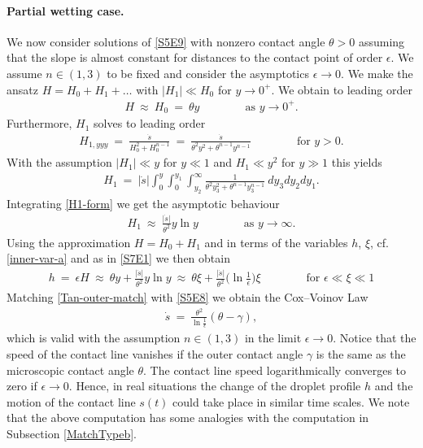 \documentclass[pagesize,pdftex]{amsart}
\newcommand{\gam}{\gamma}
\newcommand{\eps}{\epsilon}
\newcommand{\ang}{\theta}
\begin{document}
\paragraph{Partial wetting case.}

We now consider solutions of \eqref{S5E9} with nonzero contact angle $\ang > 0$
assuming that the slope is almost constant for distances to the contact point of
order $\eps$. We assume $n \in (1,3)$ to be fixed and consider the asymptotics $\eps \to 0$.  We make the ansatz
$H = H_0+H_1 + \ldots$ with $|H_1| \ll H_0$ for $y \to 0^+$. We obtain to
leading order%
\begin{align}
  H  \ %
  \approx \ H_0 \ %
  = \ \ang y \qquad\qquad \text{as $y\to 0^+$}.
\end{align}
Furthermore, $H_1$ solves to leading order
\begin{align}
  H_{1,yyy} \ %
  = \ \frac{\dot s}{H_0^2+H_0^{n-1}} \ %
  = \ \frac{\dot s}{\ang^2 y^2  + \ang^{n-1} y^{n-1}} \qquad\qquad %
  \text{for $y>0$.} 
\end{align}
With the assumption $|H_1| \ll y$ for $y \ll 1$ and $H_1 \ll y^2$ for $y \gg 1$
this yields%
\begin{align} \label{H1-form} %
  H_1 \ %
  = \ |\dot s| \int_0^y \int_0^{y_1} \int_{y_2}^{\infty }\frac{1}{\ang^2 y_3^2 +
  \ang^{n-1} y_3^{n-1}} \ dy_3 dy_2 dy_1.
\end{align}
Integrating \eqref{H1-form} we get the asymptotic behaviour 
\begin{align}
  H_1 \ %
  \approx \ \frac{|\dot s|}{\ang^2}y\ln y \qquad\qquad %
  \text{as $y\to \infty$.}
\end{align}
Using the approximation $H = H_0 + H_1$ and in terms of the variables $h$,
$\xi$, cf. \eqref{inner-var-a} and as in \eqref{S7E1} we then obtain%
\begin{align} \label{Tan-outer-match} %
  h \ = \ \eps H \ %
  \approx \ \ang y+ \frac{|\dot s|}{\ang^2}y\ln y \ %
  \approx \ \ang\xi + \frac{|\dot s|}{\ang^2} \big(\ln \frac 1{\eps}\big) \xi  \qquad\qquad %
  \text{for $\eps \ll \xi \ll 1$}
\end{align}
Matching \eqref{Tan-outer-match} with \eqref{S5E8} we obtain the Cox--Voinov Law
\cite{Voinov-1977,Cox-1986,Hocking-1992} %
\begin{align} \label{S7E4} %
  \dot s \ %
  = \ \frac{\ang^2}{\ln \frac 1\eps} (\ang-\gam),
\end{align}
which is valid with the assumption $n \in (1,3)$ in the limit $\eps \to
0$. Notice that the speed of the contact line vanishes if the outer contact
angle $\gam$ is the same as the microscopic contact angle $\ang$. The contact
line speed logarithmically converges to zero if $\eps \to 0$. Hence, in real
situations the change of the droplet profile $h$ and the motion of the contact
line $s(t)$ could take place in similar time scales. We note that the above
computation has some analogies with the computation in Subsection
\ref{MatchTypeb}.
\end{document}
